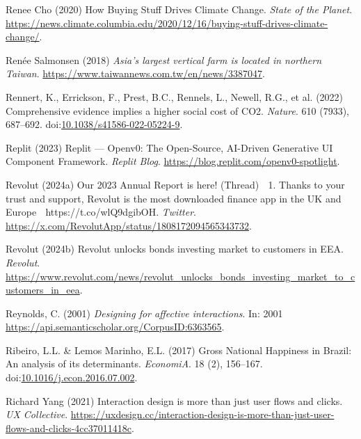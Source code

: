 \documentclass[
  letterpaper,
  DIV=11,
  numbers=noendperiod]{scrartcl}
\newlength{\cslhangindent}
\newenvironment{CSLReferences}[2] %
 {\begin{list}{}{%
  \setlength{\itemindent}{0pt}
  \setlength{\leftmargin}{0pt}
  \setlength{\parsep}{0pt}
  \ifodd #1
   \setlength{\leftmargin}{\cslhangindent}
   \setlength{\itemindent}{-1\cslhangindent}
  \fi
  \setlength{\itemsep}{#2\baselineskip}}}
 {\end{list}}
\begin{document}
\begin{CSLReferences}{0}{1}
Renee Cho (2020) How {Buying Stuff Drives Climate Change}. \emph{State
of the Planet}.
\url{https://news.climate.columbia.edu/2020/12/16/buying-stuff-drives-climate-change/}.

Renée Salmonsen (2018) \emph{Asia's largest vertical farm is located in
northern {Taiwan}}. \url{https://www.taiwannews.com.tw/en/news/3387047}.

Rennert, K., Errickson, F., Prest, B.C., Rennels, L., Newell, R.G., et
al. (2022) Comprehensive evidence implies a higher social cost of {CO2}.
\emph{Nature}. 610 (7933), 687--692.
doi:\href{https://doi.org/10.1038/s41586-022-05224-9}{10.1038/s41586-022-05224-9}.

Replit (2023) Replit --- {Openv0}: {The Open-Source}, {AI-Driven
Generative UI Component Framework}. \emph{Replit Blog}.
\url{https://blog.replit.com/openv0-spotlight}.

Revolut (2024a) Our 2023 {Annual Report} is here! ({Thread}) 🧵 1.
{Thanks} to your trust and support, {Revolut} is the most downloaded
finance app in the {UK} and {Europe} 🚀 {https://t.co/wlQ9dgibOH}.
\emph{Twitter}.
\url{https://x.com/RevolutApp/status/1808172094565343732}.

Revolut (2024b) Revolut unlocks bonds investing market to customers in
{EEA}. \emph{Revolut}.
\url{https://www.revolut.com/news/revolut_unlocks_bonds_investing_market_to_customers_in_eea}.

Reynolds, C. (2001) \emph{Designing for affective interactions}. In:
2001 \url{https://api.semanticscholar.org/CorpusID:6363565}.

Ribeiro, L.L. \& Lemos Marinho, E.L. (2017) Gross {National Happiness}
in {Brazil}: {An} analysis of its determinants. \emph{EconomiA}. 18 (2),
156--167.
doi:\href{https://doi.org/10.1016/j.econ.2016.07.002}{10.1016/j.econ.2016.07.002}.

Richard Yang (2021) Interaction design is more than just user flows and
clicks. \emph{UX Collective}.
\url{https://uxdesign.cc/interaction-design-is-more-than-just-user-flows-and-clicks-4cc37011418c}.


\end{CSLReferences}
\end{document}
